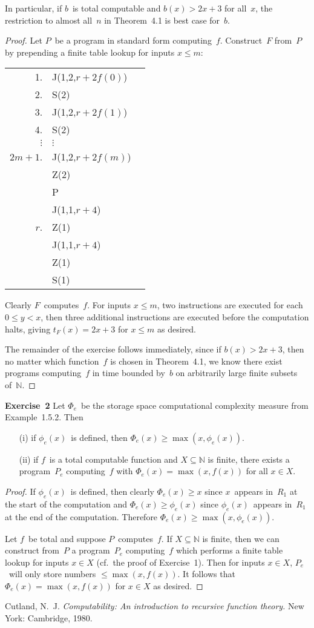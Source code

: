 \documentclass[letterpaper]{article}
\newcommand{\exercise}[2][]{\noindent\textbf{Exercise~{#2}}\ifthenelse{\isempty{#1}}{\textbf{.}}{ ({#1})\textbf{.}}}
\newcommand{\N}{\mathbb{N}}
\theoremstyle{plain}
\theoremstyle{definition}
\theoremstyle{remark}
\begin{document}
In particular, if $b$~is total computable and $b(x)>2x+3$ for all~$x$, the restriction to almost all~$n$ in Theorem~4.1 is best case for~$b$.
\begin{proof}
Let $P$~be a program in standard form computing~$f$. Construct~$F$ from~$P$ by prepending a finite table lookup for inputs $x\le m$:
\begin{center}
\begin{tabular}{rll}
1.&J(1,2,$r+2f(0)$)\\
2.&S(2)\\
3.&J(1,2,$r+2f(1)$)\\
4.&S(2)\\
$\vdots$&$\vdots$\\
$2m+1$.&J(1,2,$r+2f(m)$)\\
&Z(2)\\
&P\\
&J(1,1,$r+4$)\\
$r$.&Z(1)\\
&J(1,1,$r+4$)\\
&Z(1)\\
&S(1)
\end{tabular}
\end{center}
Clearly $F$~computes~$f$. For inputs $x\le m$, two instructions are executed for each $0\le y<x$, then three additional instructions are executed before the computation halts, giving $t_F(x)=2x+3$ for $x\le m$ as desired.

The remainder of the exercise follows immediately, since if $b(x)>2x+3$, then no matter which function~$f$ is chosen in Theorem~4.1, we know there exist programs computing~$f$ in time bounded by~$b$ on arbitrarily large finite subsets of~$\N$.
\end{proof}

\exercise{2}
Let $\Phi_e$~be the storage space computational complexity measure from Example~1.5.2. Then
\begin{enumerate}[itemsep=0pt]
\item[(i)] if $\phi_e(x)$~is defined, then $\Phi_e(x)\ge\max(x,\phi_e(x))$.
\item[(ii)] if $f$~is a total computable function and $X\subseteq\N$ is finite, there exists a program~$P_e$ computing~$f$ with $\Phi_e(x)=\max(x,f(x))$ for all $x\in X$.
\end{enumerate}
\begin{proof}
If $\phi_e(x)$~is defined, then clearly $\Phi_e(x)\ge x$ since $x$~appears in~$R_1$ at the start of the computation and $\Phi_e(x)\ge\phi_e(x)$ since $\phi_e(x)$~appears in~$R_1$ at the end of the computation. Therefore $\Phi_e(x)\ge\max(x,\phi_e(x))$.

Let $f$~be total and suppose $P$~computes~$f$. If $X\subseteq\N$ is finite, then we can construct from~$P$ a program~$P_e$ computing~$f$ which performs a finite table lookup for inputs $x\in X$ (cf.~the proof of Exercise~1). Then for inputs $x\in X$, $P_e$~will only store numbers $\le\max(x,f(x))$. It follows that $\Phi_e(x)=\max(x,f(x))$ for $x\in X$ as desired.
\end{proof}

\begin{thebibliography}{0}
 Cutland, N.~J. \emph{Computability: An introduction to recursive function theory.} New York: Cambridge, 1980.
\end{thebibliography}
\end{document}
